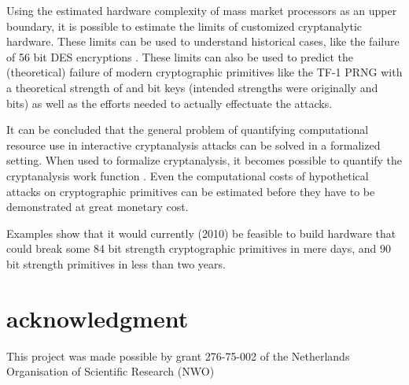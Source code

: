 \documentclass{article}
\begin{document}
Using the estimated hardware complexity of mass market processors as an
upper boundary, it is possible to estimate the limits of customized cryptanalytic
hardware. These limits can be used to understand historical cases, like the failure
of 56 bit DES encryptions \cite{DEScracker:1998}. 
These limits can also be used to predict the (theoretical) failure of modern
cryptographic primitives like the TF-1 PRNG with a theoretical strength
of  and  bit keys (intended strengths were originally  and 
 bits) \cite{KlimovShamir04,tsaban:0507063} as well as the efforts 
needed to actually effectuate the attacks.

It can be concluded that the general problem of quantifying computational 
resource use in interactive cryptanalysis attacks can be solved in a 
formalized setting. When used to formalize cryptanalysis, it becomes possible 
to quantify the cryptanalysis work function \cite{Shannon1949}. Even the 
computational costs of hypothetical attacks on cryptographic primitives can 
be estimated before they have to be demonstrated at great monetary cost. 

Examples show
that it would currently (2010) be feasible to build hardware that could break 
some 84 bit strength cryptographic primitives in mere days, and 90 bit 
strength primitives in less than two years.

\section{acknowledgment}
This project was made possible by grant 276-75-002 of the Netherlands
Organisation of Scientific Research (NWO)




\end{document}
